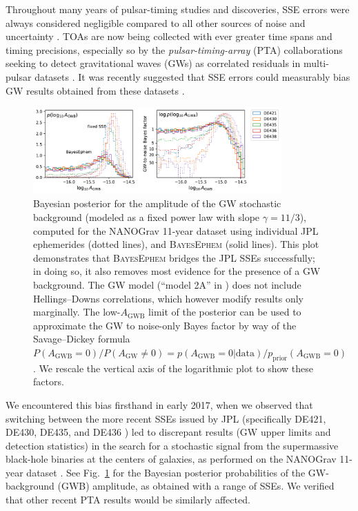 \documentclass[reprint,
 amsmath,amssymb,
 aps,prd,floatfix,
]{revtex4-1}
\begin{document}
Throughout many years of pulsar-timing studies and discoveries, SSE errors were always considered negligible compared to all other sources of noise and uncertainty \cite{1990ApJ...361..300F,2006MNRAS.372.1549E}.
TOAs are now being collected with ever greater time spans and timing precisions, especially so by the \emph{pulsar-timing-array} (PTA) collaborations seeking to detect gravitational waves (GWs) as correlated residuals in multi-pulsar datasets \cite{saz78,det79,fb90,ml13,dcl+16,h13,v+16}.
It was recently suggested that SSE errors could measurably bias GW results obtained from these datasets \citep{2016MNRAS.455.4339T,2019ApJ...876...55R}.
%
\begin{figure}[t]
    \includegraphics[width=0.85\textwidth]{figures/GWposterior.pdf}
    \caption{Bayesian posterior for the amplitude of the GW stochastic background (modeled as a fixed power law with slope $\gamma = 11/3$), computed for the NANOGrav 11-year dataset using individual JPL ephemerides (dotted lines), and \textsc{BayesEphem} (solid lines).
    This plot demonstrates that \textsc{BayesEphem} bridges the JPL SSEs successfully; in doing so, it also removes most evidence for the presence of a GW background.
    The GW model (``model 2A'' in \cite{2018ApJ...859...47A}) does not include Hellings--Downs correlations, which however modify results only marginally.
    The low-$A_\mathrm{GWB}$ limit of the posterior can be used to approximate the GW to noise-only Bayes factor by way of the Savage--Dickey formula $P(A_\mathrm{GWB}=0)/P(A_\mathrm{GW}\neq 0) = p(A_\mathrm{GWB}=0|\mathrm{data})/p_\mathrm{prior}(A_\mathrm{GWB}=0)$ \citep{d71}. We rescale the vertical axis of the logarithmic plot to show these factors. \label{fig:posteriors}}
\end{figure}

We encountered this bias firsthand in early 2017, when we observed that switching between the more recent SSEs issued by JPL (specifically DE421, DE430, DE435, and DE436 \cite{2009IPNPR.178C...1F,2014IPNPR.196C...1F,de435,de436}) led to discrepant results (GW upper limits and detection statistics) in the search for a stochastic signal from the supermassive black-hole binaries at the centers of galaxies, as performed on the NANOGrav 11-year dataset \cite{2018ApJS..235...37A,2018ApJ...859...47A}.
See Fig.\ \ref{fig:posteriors} for the Bayesian posterior probabilities of the GW-background (GWB) amplitude, as obtained with a range of SSEs. We verified that other recent PTA results \cite{2015Sci...349.1522S,2016ApJ...821...13A} would be similarly affected.
\end{document}
